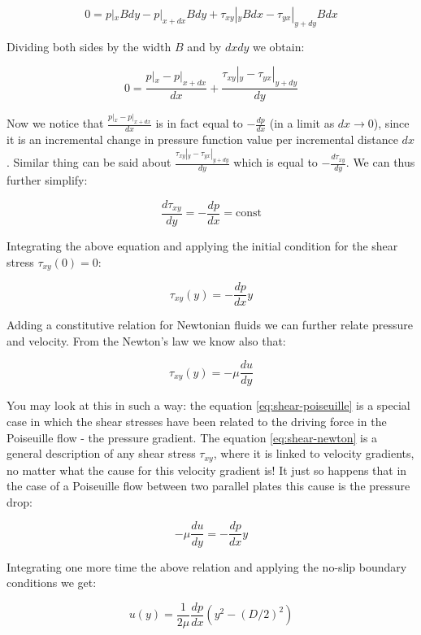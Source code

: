 \begin{equation}
0 = p|_x B dy - p|_{x+dx} B dy + \tau_{xy}|_y B dx - \tau_{yx}|_{y+dy} B dx
\end{equation}

Dividing both sides by the width $B$ and by $dx dy$ we obtain:

\begin{equation}
0 = \frac{p|_x  - p|_{x+dx}}{dx}  + \frac{\tau_{xy}|_y  - \tau_{yx}|_{y+dy}}{dy} 
\end{equation}

Now we notice that $\frac{p|_x  - p|_{x+dx}}{dx}$ is in fact equal to $-\frac{dp}{dx}$ (in a limit as $dx \rightarrow 0$), since it is an incremental change in pressure function value per incremental distance $dx$. Similar thing can be said about $\frac{\tau_{xy}|_y  - \tau_{yx}|_{y+dy}}{dy}$ which is equal to $-\frac{d \tau_{xy}}{dy}$. We can thus further simplify:

\begin{equation}
\frac{d \tau_{xy}}{dy} = - \frac{dp}{dx} = \text{const}
\end{equation}

Integrating the above equation and applying the initial condition for the shear stress $\tau_{xy}(0) = 0$:

\begin{equation} \label{eq:shear-poiseuille}
\tau_{xy}(y)= - \frac{dp}{dx} y
\end{equation}

Adding a constitutive relation for Newtonian fluids we can further relate pressure and velocity. From the Newton's law we know also that:

\begin{equation} \label{eq:shear-newton}
\tau_{xy}(y)= - \mu \frac{du}{dy}
\end{equation}

You may look at this in such a way: the equation \ref{eq:shear-poiseuille} is a special case in which the shear stresses have been related to the driving force in the Poiseuille flow - the pressure gradient. The equation \ref{eq:shear-newton} is a general description of any shear stress $\tau_{xy}$, where it is linked to velocity gradients, no matter what the cause for this velocity gradient is! It just so happens that in the case of a Poiseuille flow between two parallel plates this cause is the pressure drop:

\begin{equation}
- \mu \frac{du}{dy} = - \frac{dp}{dx} y
\end{equation}

Integrating one more time the above relation and applying the no-slip boundary conditions we get:

\begin{equation}
u(y) = \frac{1}{2 \mu} \frac{dp}{dx} (y^2 - (D/2)^2)
\end{equation}

